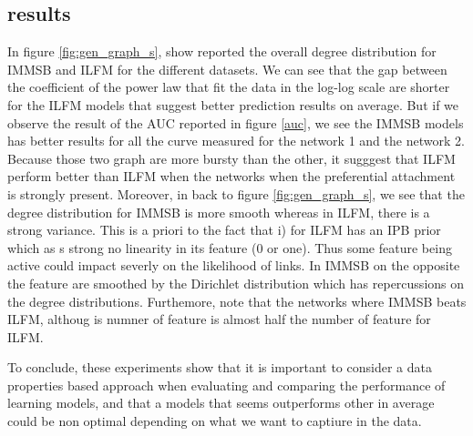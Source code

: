 \subsection{results}

In figure \ref{fig:gen_graph_s}, show reported the overall degree distribution for IMMSB and ILFM for the different datasets. We can see that the gap between the coefficient of the power law that fit the data in the log-log scale are shorter for the ILFM models that suggest better prediction results on average. But if we observe the result of the AUC reported in figure \ref{auc}, we see the IMMSB models has better results for all the curve measured for the network 1 and the network 2. Because those two graph are more bursty than the other, it sugggest that ILFM perform better than ILFM when the networks when the preferential attachment is strongly present. Moreover, in back to figure \ref{fig:gen_graph_s}, we see that the degree distribution for IMMSB is more smooth whereas in ILFM, there is a strong variance. This is a priori to the fact that i) for ILFM  has an IPB prior which as s strong no linearity in its feature (0 or one). Thus some feature being active could impact severly on the likelihood of links. In IMMSB on the opposite the feature are smoothed by the Dirichlet distribution which has repercussions on the degree distributions. Furthemore, note that the networks where IMMSB beats ILFM, althoug is numner of feature is almost half the number of feature for ILFM.

To conclude, these experiments show that it is important to consider a data properties based approach when evaluating and comparing the performance of learning models, and that a models that seems outperforms other in average could be non optimal depending on what we want to captiure in the data.
